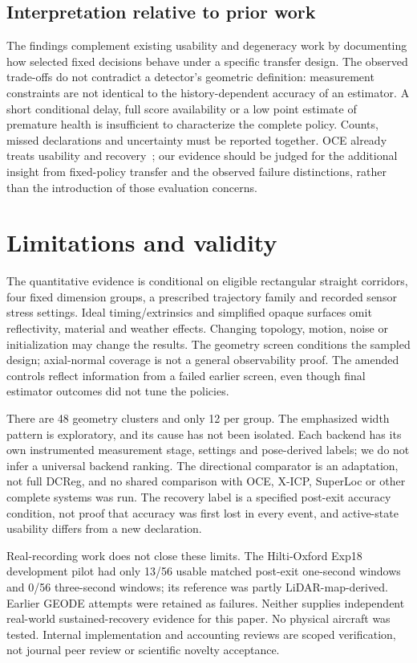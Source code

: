 \documentclass[11pt,a4paper]{article}
\begin{document}
\subsection{Interpretation relative to prior work}
The findings complement existing usability and degeneracy work by
documenting how selected fixed decisions behave under a specific transfer
design. The observed trade-offs do not contradict a detector's geometric
definition: measurement constraints are not identical to the history-dependent
accuracy of an estimator. A short conditional delay, full score availability
or a low point estimate of premature health is insufficient to characterize
the complete policy. Counts, missed declarations and uncertainty must be
reported together. OCE already treats usability and recovery~\cite{oce};
our evidence should be judged for the additional insight from fixed-policy
transfer and the observed failure distinctions, rather than the introduction
of those evaluation concerns.

\section{Limitations and validity}
The quantitative evidence is conditional on eligible rectangular straight
corridors, four fixed dimension groups, a prescribed trajectory family and
recorded sensor stress settings. Ideal timing/extrinsics and simplified
opaque surfaces omit reflectivity, material and weather effects. Changing
topology, motion, noise or initialization may change the results. The
geometry screen conditions the sampled design; axial-normal coverage is
not a general observability proof. The amended controls reflect information
from a failed earlier screen, even though final estimator outcomes did not
tune the policies.

There are 48 geometry clusters and only 12 per group. The emphasized width
pattern is exploratory, and its cause has not been isolated. Each backend
has its own instrumented measurement stage, settings and pose-derived labels;
we do not infer a universal backend ranking. The directional comparator is
an adaptation, not full DCReg, and no shared comparison with OCE, X-ICP,
SuperLoc or other complete systems was run. The recovery label is a specified
post-exit accuracy condition, not proof that accuracy was first lost in
every event, and active-state usability differs from a new declaration.

Real-recording work does not close these limits. The Hilti-Oxford Exp18
development pilot had only 13/56 usable matched post-exit one-second windows
and 0/56 three-second windows; its reference was partly LiDAR-map-derived.
Earlier GEODE attempts were retained as failures. Neither supplies independent
real-world sustained-recovery evidence for this paper. No physical aircraft
was tested. Internal implementation and accounting reviews are scoped
verification, not journal peer review or scientific novelty acceptance.
\end{document}
